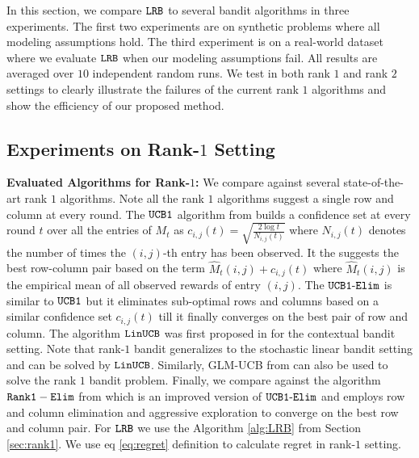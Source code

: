 In this section, we compare ${\tt LRB}$ to several bandit algorithms in three experiments. The first two experiments are on synthetic problems where all modeling assumptions hold. The third experiment is on a real-world dataset where we evaluate ${\tt LRB}$ when our modeling assumptions fail. All results are averaged over $10$ independent random runs. We test in both rank $1$ and rank $2$ settings to clearly illustrate the failures of the current rank $1$ algorithms and show the efficiency of our proposed method. 



\subsection{Experiments on Rank-$1$ Setting}

\textbf{Evaluated Algorithms for Rank-$1$:} We compare against several state-of-the-art rank $1$ algorithms. Note all the rank $1$ algorithms suggest a single row and column at every round. The ${\tt UCB1}$ algorithm from \citet{auer2002finite} builds a confidence set at every round $t$ over all the entries of $M_t$ as $c_{i, j}(t) = \sqrt{\frac{2\log t}{N_{i, j}(t)}}$ where $N_{i, j}(t)$ denotes the number of times the $(i,j)$-th entry has been observed. It the suggests the best row-column pair based on the term $\hat{M}_{t}(i,j) + c_{i, j}(t)$ where $\hat{M}_{t}(i,j)$ is the empirical mean of all observed rewards of entry $(i,j)$. The ${\tt UCB1\mbox{-}Elim}$ \citep{auer2010ucb} is similar to ${\tt UCB1}$ but it eliminates sub-optimal rows and columns  based on a similar confidence set  $c_{i, j}(t)$ till it finally converges on the best pair of row and column. The algorithm ${\tt LinUCB}$ was first proposed in \citet{li2010contextual} for the contextual bandit setting. Note that rank-$1$ bandit generalizes to the stochastic linear bandit setting and can be solved by ${\tt LinUCB}$. Similarly, GLM-UCB from \citet{filippi2010parametric} can also be used to solve the rank $1$ bandit problem. Finally, we compare against the algorithm $\tt Rank1-Elim$ from \citet{katariya2016stochastic} which is an improved version of ${\tt UCB1\mbox{-}Elim}$ and employs row and column elimination and aggressive exploration to converge on the best row and column pair. For ${\tt LRB}$ we use the Algorithm \ref{alg:LRB} from Section \ref{sec:rank1}. We use eq \eqref{eq:regret} definition to calculate regret in rank-$1$ setting.

